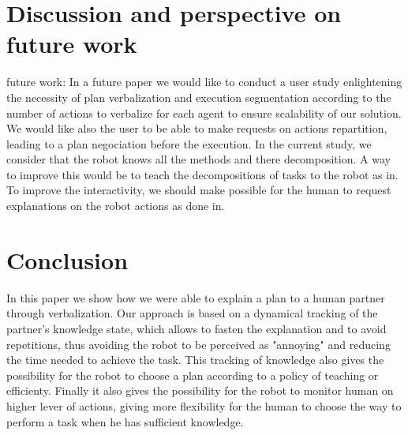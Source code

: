 \documentclass{llncs}
\begin{document}



\section{Discussion and perspective on future work}


future work:
In a future paper we would like to conduct a user study enlightening the necessity of  plan verbalization and execution segmentation according to the number of actions to verbalize for each agent to ensure scalability of our solution.
We would like also the user to be able to make requests on actions repartition, leading to a plan negociation before the execution.
In the current study, we consider that the robot knows all the methods and there decomposition. A way to improve this would be to teach the decompositions of tasks to the robot as in\cite{Mohseni2015}.
To improve the interactivity, we should make possible for the human to request explanations on the robot actions as done in\cite{Lomas2012}.



\section{Conclusion}
In this paper we show how we were able to explain a plan to a human partner through verbalization.
Our approach is based on a dynamical tracking of the partner's knowledge state, which allows to 
fasten the explanation and to avoid repetitions, thus avoiding the robot to be perceived as "annoying" and reducing the time needed to achieve the task.
This tracking of knowledge also gives the possibility for the robot to choose a plan according to a policy of teaching or efficienty. Finally it also
gives the possibility for the robot to monitor human on higher lever of actions, giving more flexibility for the human to choose the way to perform a task when he has sufficient knowledge.


%


\end{document}
